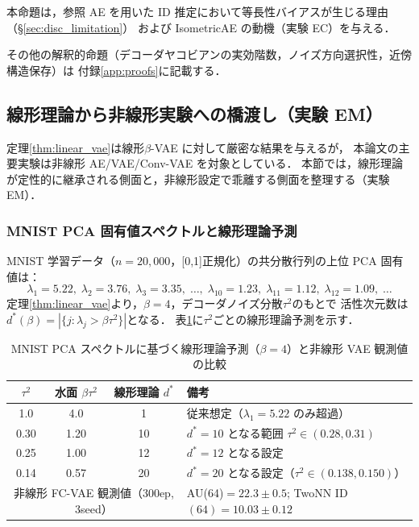 \documentclass[11pt,a4paper]{jsarticle}
\begin{document}
本命題は，参照 AE を用いた ID 推定において等長性バイアスが生じる理由（§\ref{sec:disc_limitation}）
および IsometricAE の動機（実験 EC）を与える．

その他の解釈的命題（デコーダヤコビアンの実効階数，ノイズ方向選択性，近傍構造保存）は
付録\ref{app:proofs}に記載する．

\subsection{線形理論から非線形実験への橋渡し（実験 EM）}\label{sec:theory_bridge}

定理\ref{thm:linear_vae}は線形$\beta$-VAE に対して厳密な結果を与えるが，
本論文の主要実験は非線形 AE/VAE/Conv-VAE を対象としている．
本節では，線形理論が定性的に継承される側面と，非線形設定で乖離する側面を整理する（実験 EM）．

\subsubsection*{MNIST PCA 固有値スペクトルと線形理論予測}

MNIST 学習データ（$n = 20{,}000$，[0,1]正規化）の共分散行列の上位 PCA 固有値は：
\[
\lambda_1=5.22,\; \lambda_2=3.76,\; \lambda_3=3.35,\;\ldots,\;
\lambda_{10}=1.23,\; \lambda_{11}=1.12,\; \lambda_{12}=1.09,\;\ldots
\]
定理\ref{thm:linear_vae}より，$\beta=4$，デコーダノイズ分散$\tau^2$のもとで
活性次元数は$d^*(\beta) = |\{j : \lambda_j > \beta\tau^2\}|$となる．
表\ref{tab:theory_pred}に$\tau^2$ごとの線形理論予測を示す．

\begin{table}[H]
\centering
\caption{MNIST PCA スペクトルに基づく線形理論予測（$\beta=4$）と非線形 VAE 観測値の比較}
\label{tab:theory_pred}
\small
\begin{tabular}{ccc|l}
\toprule
$\tau^2$ & 水面 $\beta\tau^2$ & 線形理論 $d^*$ & 備考 \\
\midrule
1.0  & 4.0  & 1   & 従来想定（$\lambda_1=5.22$ のみ超過）\\
0.30 & 1.20 & 10  & $d^* = 10$ となる範囲 $\tau^2 \in (0.28, 0.31)$ \\
0.25 & 1.00 & 12  & $d^* = 12$ となる設定 \\
0.14 & 0.57 & 20  & $d^* = 20$ となる設定（$\tau^2 \in (0.138, 0.150)$） \\
\midrule
\multicolumn{3}{c|}{非線形 FC-VAE 観測値（300ep, 3seed）} & AU(64)$=22.3\pm0.5$; TwoNN ID$(64)=10.03\pm0.12$ \\
\bottomrule
\end{tabular}
\end{table}
\end{document}
